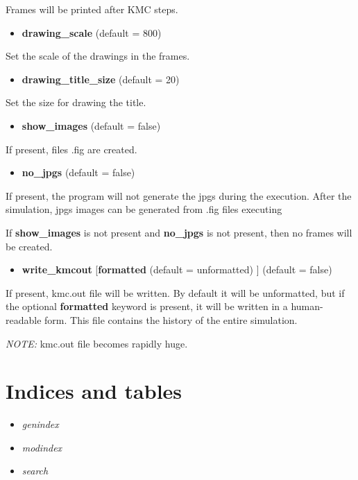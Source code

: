 \documentclass[letterpaper,10pt,english]{sphinxmanual}
\begin{document}
Frames will be printed after  KMC steps.
\begin{itemize}
\item {} 
\textbf{drawing\_scale}   (default = 800)

\end{itemize}

Set the scale of the drawings in the frames.
\begin{itemize}
\item {} 
\textbf{drawing\_title\_size}   (default = 20)

\end{itemize}

Set the size for drawing the title.
\begin{itemize}
\item {} 
\textbf{show\_images}  (default = false)

\end{itemize}

If present, files .fig  are created.
\begin{itemize}
\item {} 
\textbf{no\_jpgs}  (default = false)

\end{itemize}

If present, the program will not generate the jpgs during the execution.
After the simulation, jpgs images can be generated from .fig files
executing
\begin{quote}

\end{quote}

If \textbf{show\_images} is not present and \textbf{no\_jpgs} is not present, then no frames
will be created.
\begin{itemize}
\item {} 
\textbf{write\_kmcout} {[}\textbf{formatted} (default = unformatted) {]} (default = false)

\end{itemize}

If present, kmc.out file will be written. By default it will be unformatted,
but if the optional \textbf{formatted} keyword is present, it will be written in a
human-readable form. This file contains the history of the entire simulation.

\emph{NOTE:} kmc.out file becomes rapidly huge.


\chapter{Indices and tables}
\label{index:indices-and-tables}\begin{itemize}
\item {} 
\emph{genindex}

\item {} 
\emph{modindex}

\item {} 
\emph{search}

\end{itemize}



\renewcommand{\indexname}{Index}
\printindex
\end{document}
